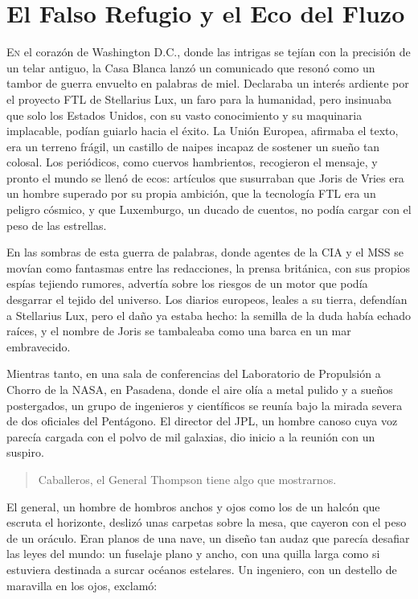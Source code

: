 \documentclass{book}
\begin{document}
\chapter{El Falso Refugio y el Eco del Fluzo}

\lettrine[lines=2, loversize=0.3, lraise=0]{E}{n} el corazón de Washington D.C., donde las intrigas se tejían con la precisión de un telar antiguo, la Casa Blanca lanzó un comunicado que resonó como un tambor de guerra envuelto en palabras de miel. Declaraba un interés ardiente por el proyecto FTL de Stellarius Lux, un faro para la humanidad, pero insinuaba que solo los Estados Unidos, con su vasto conocimiento y su maquinaria implacable, podían guiarlo hacia el éxito. La Unión Europea, afirmaba el texto, era un terreno frágil, un castillo de naipes incapaz de sostener un sueño tan colosal. Los periódicos, como cuervos hambrientos, recogieron el mensaje, y pronto el mundo se llenó de ecos: artículos que susurraban que Joris de Vries era un hombre superado por su propia ambición, que la tecnología FTL era un peligro cósmico, y que Luxemburgo, un ducado de cuentos, no podía cargar con el peso de las estrellas.

En las sombras de esta guerra de palabras, donde agentes de la CIA y el MSS se movían como fantasmas entre las redacciones, la prensa británica, con sus propios espías tejiendo rumores, advertía sobre los riesgos de un motor que podía desgarrar el tejido del universo. Los diarios europeos, leales a su tierra, defendían a Stellarius Lux, pero el daño ya estaba hecho: la semilla de la duda había echado raíces, y el nombre de Joris se tambaleaba como una barca en un mar embravecido.

Mientras tanto, en una sala de conferencias del Laboratorio de Propulsión a Chorro de la NASA, en Pasadena, donde el aire olía a metal pulido y a sueños postergados, un grupo de ingenieros y científicos se reunía bajo la mirada severa de dos oficiales del Pentágono. El director del JPL, un hombre canoso cuya voz parecía cargada con el polvo de mil galaxias, dio inicio a la reunión con un suspiro.

\begin{quote}
\calli
\glqq Caballeros, el General Thompson tiene algo que mostrarnos.\grqq
\end{quote}

El general, un hombre de hombros anchos y ojos como los de un halcón que escruta el horizonte, deslizó unas carpetas sobre la mesa, que cayeron con el peso de un oráculo. Eran planos de una nave, un diseño tan audaz que parecía desafiar las leyes del mundo: un fuselaje plano y ancho, con una quilla larga como si estuviera destinada a surcar océanos estelares. Un ingeniero, con un destello de maravilla en los ojos, exclamó:
\end{document}
